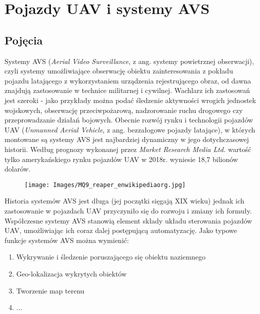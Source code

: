 \chapter{Pojazdy UAV i systemy AVS}
\label{cha:Pojazdy_UAV_i_systemy_AVS}
\section{Pojęcia}
\label{sec:Pojecia}
Systemy AVS (\textit{Aerial Video Surveillance}, z ang. systemy powietrznej obserwacji), czyli systemy umożliwiające obserwację obiektu zainteresowania z pokładu pojazdu latającego z wykorzystaniem urządzenia rejestrującego obraz, od dawna znajdują zastosowanie w technice militarnej i cywilnej. Wachlarz ich zastosowań jest szeroki - jako przykłady można podać śledzenie aktywności wrogich jednostek wojskowych, obserwację przeciwpożarową, nadzorowanie ruchu drogowego czy przeprowadzanie działań bojowych. Obecnie rozwój rynku i technologii pojazdów UAV (\textit{Unmanned Aerial Vehicle}, z ang. bezzałogowe pojazdy latające), w których montowane są systemy AVS jest najbardziej dynamiczny w jego dotychczasowej historii. Według prognozy wykonanej przez \textit{Market Research Media Ltd.} \cite{MarResMedUAVMarket} wartość tylko amerykańskiego rynku pojazdów UAV w 2018r. wyniesie 18,7 bilionów dolarów.

\begin{figure}[!htb]
	\centering
	\texttt{[image: Images/MQ9\_reaper\_enwikipediaorg.jpg]}
	\label{img:MQ9_Reaper}
\end{figure}

Historia systemów AVS jest długa (jej początki sięgają XIX wieku) jednak ich zastosowanie w pojazdach UAV przyczyniło się do rozwoju i zmiany ich formuły. Współczesne systemy AVS stanowią element składy układu sterowania pojazdów UAV, umożliwiając ich coraz dalej postępującą automatyzację.
Jako typowe funkcje systemów AVS można wymienić:
\begin{enumerate}
\item Wykrywanie i śledzenie poruszającego się obiektu naziemnego
\item Geo-lokalizacja wykrytych obiektów
\item Tworzenie map terenu
\item ...
\end{enumerate}